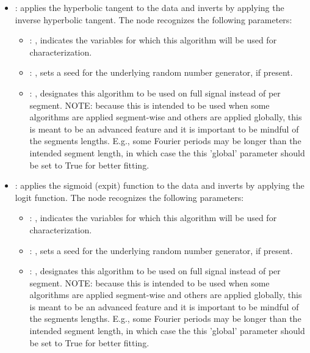 \begin{itemize}
    \item {}:
      applies the hyperbolic tangent to the data and inverts by applying the
      inverse hyperbolic tangent.
      The  node recognizes the following parameters:
        \begin{itemize}
          \item {}: ,
            indicates the variables for which this algorithm will be used for characterization.
          \item {}: ,
            sets a seed for the underlying random number generator, if present.
          \item {}: ,
            designates this algorithm to be used on full signal instead of per
            segment. NOTE: because this is intended to be used when some algorithms are
            applied segment-wise and others are applied globally, this is meant to be an
            advanced feature and it is important to be mindful of the segments lengths.
            E.g., some Fourier periods may be longer than the intended segment length, in
            which case the this 'global' parameter should be set to True for better
            fitting. 
      \end{itemize}

    \item {}:
      applies the sigmoid (expit) function to the data and inverts by applying
      the logit function.
      The  node recognizes the following parameters:
        \begin{itemize}
          \item {}: ,
            indicates the variables for which this algorithm will be used for characterization.
          \item {}: ,
            sets a seed for the underlying random number generator, if present.
          \item {}: ,
            designates this algorithm to be used on full signal instead of per
            segment. NOTE: because this is intended to be used when some algorithms are
            applied segment-wise and others are applied globally, this is meant to be an
            advanced feature and it is important to be mindful of the segments lengths.
            E.g., some Fourier periods may be longer than the intended segment length, in
            which case the this 'global' parameter should be set to True for better
            fitting. 
      \end{itemize}


\end{itemize}
